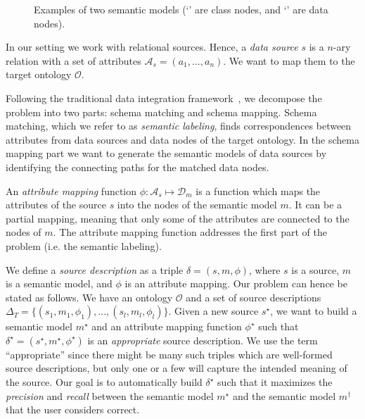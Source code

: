 \documentclass[letterpaper]{article} %
\newcommand{\authornote}[3]{
  {\fbox{\sc 
  #1}:$\blacktriangleright$\textcolor{#2}{\small{#3}}$\blacktriangleleft$}%
}
\newcommand{\npr}[1]{\authornote{NPR}{orange}{#1}}
\begin{document}
\begin{figure}[ht]
{
}
\caption{Examples of two semantic models (`\protect{}' are class nodes, and `\protect{}' are data 
nodes).}
\label{FIG:sem}
\vspace{-3mm}
\end{figure}

In our setting we work with relational sources.
Hence, a \emph{data source} $s$ is a $n$-ary relation with a set of attributes 
$\mathcal{A}_s = (a_1,...,a_n)$.
We want to map them to the target ontology $\mathcal{O}$.

Following the traditional data integration framework~\cite{doan2012principles}, we decompose the problem into two parts: schema matching and schema mapping.
Schema matching, which we refer to as \emph{semantic labeling}, finds 
correspondences between attributes from data sources and data nodes of the 
target ontology.
In the schema mapping part we want to generate the semantic models of data sources by identifying the connecting paths for the matched data nodes.

An \emph{attribute mapping} function $\phi : \mathcal{A}_s \mapsto 
\mathcal{D}_m$ is a function which maps the attributes of the source $s$ into the nodes of the semantic model $m$. 
It can be a partial mapping, meaning that only some of the attributes
are connected to the nodes of $m$.
The attribute mapping function addresses the first part of the problem (i.e. the semantic labeling).

We define a \emph{source description} as a triple $\delta = (s, m, \phi)$, where $s$ is a source, $m$ is a semantic model, and $\phi$ is an attribute mapping.
Our problem can hence be stated as follows. We have an ontology 
$\mathcal{O}$ and a set of source descriptions $\Delta_T = \{(s_1, m_1, \phi_1),..., 
(s_l, m_l, \phi_l)\}$.
Given a new source $s^\star$, we want to build a semantic model $m^\star$ and an attribute mapping function $\phi^\star$ such that 
$\delta^\star = (s^\star,m^\star,\phi^\star)$ is an \emph{appropriate} source description. 
We use the term ``appropriate'' since there might be many such triples which are well-formed source descriptions, 
but only one or a few will capture the intended meaning of the source. 
Our goal is to automatically build $\delta^\star$ such that it maximizes the \emph{precision} and \emph{recall} between the semantic model 
$m^\star$ and the semantic model $m^\dag$ that the user considers correct. 
\end{document}
